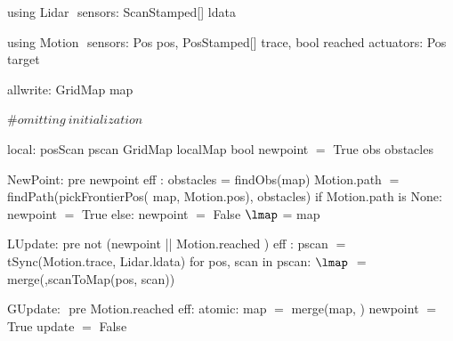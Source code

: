using Lidar $\label{lidardef}$
    sensors:
       ScanStamped[] ldata

using Motion $\label{moddef}$
    sensors:
        Pos pos,
        PosStamped[] trace,
        bool reached
    actuators:
        Pos target

allwrite:$\label{awvar}$
    GridMap map

#$\mathit{omitting\ initialization}$

local:
   posScan pscan
   GridMap localMap
   bool newpoint $=$ True
   obs obstacles

NewPoint:$\label{newpt}$
  pre newpoint
  eff :
        obstacles = findObs(map)
        Motion.path $=$ findPath(pickFrontierPos(
                              map, Motion.pos), obstacles)
        if Motion.path is None:
           newpoint $=$ True
        else:
           newpoint $=$ False
        $\lmap $ = map

LUpdate:$\label{lup}$
   pre not (newpoint || Motion.reached )
   eff :
          pscan $=$ tSync(Motion.trace, Lidar.ldata)
         for pos, scan in pscan:
             $\lmap$ $=$ merge(\lmap,scanToMap(pos, scan))

GUpdate: $\label{gup}$
  pre Motion.reached
  eff: atomic:
           map $=$ merge(map, \lmap)
        newpoint $=$ True
        update $=$ False